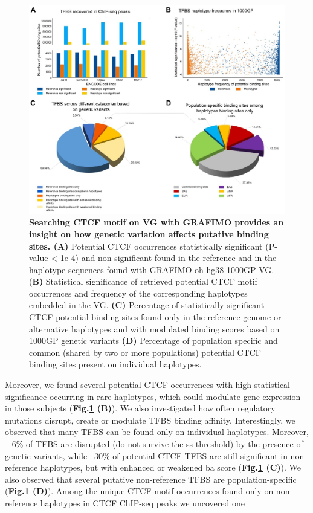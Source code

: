 \documentclass[a4paper, titlepage, openright]{book}
\begin{document}
\begin{figure}
	\centering
	\includegraphics[width=\textwidth]{figures/grafimo1.jpg}
	\caption[Searching CTCF motif on VG with GRAFIMO provides an insight on how genetic variation affects putative
binding sites]{\textbf{Searching CTCF motif on VG with GRAFIMO provides an insight on how genetic variation affects putative
binding sites. (A)} Potential CTCF occurrences statistically significant (P-value < 1e-4) and non-significant found in the
reference and in the haplotype sequences found with GRAFIMO oh hg38 1000GP VG. (\textbf{B)} Statistical significance of
retrieved potential CTCF motif occurrences and frequency of the corresponding haplotypes embedded in the VG. \textbf{(C)}
Percentage of statistically significant CTCF potential binding sites found only in the reference genome or alternative
haplotypes and with modulated binding scores based on 1000GP genetic variants \textbf{(D)} Percentage of population specific and
common (shared by two or more populations) potential CTCF binding sites present on individual haplotypes.}
	\label{fig:grafimo1}
\end{figure} 
Moreover, we found several potential CTCF occurrences with high statistical significance occurring in rare haplotypes, which could modulate gene expression in those subjects (\textbf{Fig.\ref{fig:grafimo1} (B)}). We also investigated how often regulatory mutations disrupt, create or modulate TFBS binding affinity. Interestingly, we observed that many TFBS can be found only on individual
haplotypes. Moreover, ~ 6\% of TFBS are disrupted (do not survive the ss threshold) by the presence of genetic variants, while ~30\% of potential CTCF TFBS are still significant in non-reference haplotypes, but with enhanced or weakened ba score (\textbf{Fig.\ref{fig:grafimo1} (C)}). We also observed that several putative non-reference TFBS are population-specific (\textbf{Fig.\ref{fig:grafimo1} (D)}). Among the unique CTCF motif occurrences found only on non-reference haplotypes in CTCF ChIP-seq peaks we uncovered one
\end{document}
